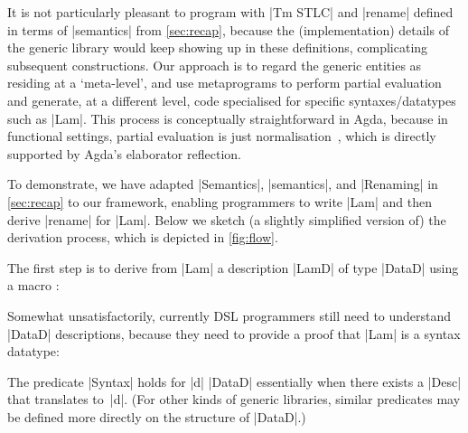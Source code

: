 \documentclass[sigplan,review,fleqn]{acmart}
\renewcommand{\verb}{\collectverb{\color{AgdaFunction}}}
\newcommand{\name}{\collectverb{\it}}
\begin{document}
It is not particularly pleasant to program with \verb|Tm STLC| and \verb|rename| defined in terms of \verb|semantics| from \cref{sec:recap}, because the (implementation) details of the generic library would keep showing up in these definitions, complicating subsequent constructions.
Our approach is to regard the generic entities as residing at a `meta-level', and use metaprograms to perform partial evaluation and generate, at a different level, code specialised for specific syntaxes/datatypes such as \verb|Lam|.
This process is conceptually straightforward in Agda, because in functional settings, partial evaluation is just normalisation~\citep{Filinski-semantic-partial-evaluation}, which is directly supported by Agda's elaborator reflection.

To demonstrate, we have adapted \verb|Semantics|, \verb|semantics|, and \verb|Renaming| in \cref{sec:recap} to our framework, enabling programmers to write \verb|Lam| and then derive \verb|rename| for \verb|Lam|.
Below we sketch (a slightly simplified version of) the derivation process, which is depicted in \cref{fig:flow}.

The first step is to derive from \verb|Lam| a description \verb|LamD| of type \verb|DataD| using a macro :
\begin{code}
	\>[0]\AgdaSpace{}%
	\AgdaSymbol{=}\AgdaSpace{}%
	\AgdaSpace{}%
	\<%
\end{code}
Somewhat unsatisfactorily, currently DSL programmers still need to understand \verb|DataD| descriptions, because they need to provide a proof that \verb|Lam| is a syntax datatype:
\begin{code}
\>\AgdaSpace{}\AgdaSymbol{:}\AgdaSpace{}\AgdaSpace{}\<
\end{code}
The predicate \verb|Syntax| holds for \name|d| \AgdaSymbol{:} \verb|DataD| essentially when there exists a \verb|Desc| that translates to~\name|d|.
(For other kinds of generic libraries, similar predicates may be defined more directly on the structure of \verb|DataD|.)


\end{document}
